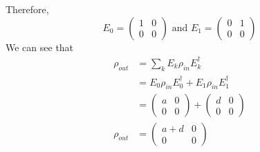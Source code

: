Therefore, 
\begin{equation}
    E_0 = \begin{pmatrix}1 & 0 \\ 0 & 0\end{pmatrix} \text{ and }
    E_1 = \begin{pmatrix}0 & 1 \\ 0 & 0\end{pmatrix} 
\end{equation}
We can see that
\begin{align}
    \rho_{out} &= \sum_k E_k \rho_{in} E_k^\dagger \\
    &=  E_0 \rho_{in} E_{0}^\dagger + E_1 \rho_{in} E_1^\dagger \\
    &= \begin{pmatrix}a  & 0 \\ 0 & 0\end{pmatrix} + \begin{pmatrix}d  & 0 \\ 0 & 0\end{pmatrix} \\
    \rho_{out }&= \begin{pmatrix}a + d & 0 \\ 0 & 0\end{pmatrix} \\
\end{align}



\newpage

